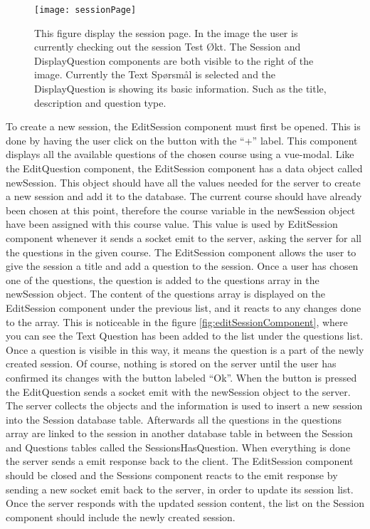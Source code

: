 \begin{figure}[H]
	\texttt{[image: sessionPage]}
	\caption{This figure display the session page. In the image the user is currently checking out the session Test Økt. The Session and DisplayQuestion components are both visible to the right of the image. Currently the Text Spørsmål is selected and the DisplayQuestion is showing its basic information. Such as the title, description and question type.}
	\label{fig:sessionPage}
\end{figure}
\noindent
To create a new session, the EditSession component must first be opened. This is done by having the user click on the button with the “+” label. 
This component displays all the available questions of the chosen course using a vue-modal. Like the EditQuestion component, the EditSession component has a data object called newSession. This object should have all the values needed for the server to create a new session and add it to the database. The current course should have already been chosen at this point, therefore the course variable in the newSession object have been assigned with this course value. This value is used by EditSession component whenever it sends a socket emit to the server, asking the server for all the questions in the given course. The EditSession component allows the user to give the session a title and add a question to the session. Once a user has chosen one of the questions, the question is added to the questions array in the newSession object. The content of the questions array is displayed on the EditSession component under the previous list, and it reacts to any changes done to the array. This is noticeable in the figure \ref{fig:editSessionComponent}, where you can see the Text Question has been added to the list under the questions list. Once a question is visible in this way, it means the question is a part of the newly created session. Of course, nothing is stored on the server until the user has confirmed its changes with the button labeled “Ok”. When the button is pressed the EditQuestion sends a socket emit with the newSession object to the server. The server collects the objects and the information is used to insert a new session into the Session database table. Afterwards all the questions in the questions array are linked to the session in another database table in between the Session and Questions tables called the SessionsHasQuestion. When everything is done the server sends a emit response back to the client. The EditSession component should be closed and the Sessions component reacts to the emit response by sending a new socket emit back to the server, in order to update its session list. Once the server responds with the updated session content, the list on the Session component should include the newly created session.  
